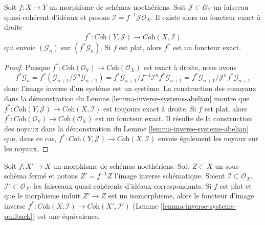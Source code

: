 \begin{lemma}
\label{lemma-inverse-systems-pullback}
Soit $f : X \to Y$ un morphisme de schémas noethériens.
Soit $\mathcal{J} \subset \mathcal{O}_Y$ un faisceau quasi-cohérent
d'idéaux et posons $\mathcal{I} = f^{-1}\mathcal{J} \mathcal{O}_X$.
Il existe alors un foncteur exact à droite
$$
f^* : \textit{Coh}(Y, \mathcal{J}) \longrightarrow \textit{Coh}(X, \mathcal{I})
$$
qui envoie $(\mathcal{G}_n)$ sur $(f^*\mathcal{G}_n)$. Si $f$ est plat,
alors $f^*$ est un foncteur exact.
\end{lemma}

\begin{proof}
Puisque $f^* : \textit{Coh}(\mathcal{O}_Y) \to \textit{Coh}(\mathcal{O}_X)$
est exact à droite, nous avons
$$
f^*\mathcal{G}_n =
f^*(\mathcal{G}_{n + 1}/\mathcal{I}^n\mathcal{G}_{n + 1}) =
f^*\mathcal{G}_{n + 1}/f^{-1}\mathcal{I}^nf^*\mathcal{G}_{n + 1} =
f^*\mathcal{G}_{n + 1}/\mathcal{J}^nf^*\mathcal{G}_{n + 1}
$$
donc l'image inverse d'un système est un système. La construction des
conoyaux dans la démonstration du Lemme \ref{lemma-inverse-systems-abelian}
montre que
$f^* : \textit{Coh}(Y, \mathcal{J}) \to \textit{Coh}(X, \mathcal{I})$
est toujours exact à droite. Si $f$ est plat, alors
$f^* : \textit{Coh}(\mathcal{O}_Y) \to \textit{Coh}(\mathcal{O}_X)$
est un foncteur exact. Il résulte de la construction des noyaux
dans la démonstration du Lemme \ref{lemma-inverse-systems-abelian}
que, dans ce cas,
$f^* : \textit{Coh}(Y, \mathcal{J}) \to \textit{Coh}(X, \mathcal{I})$
envoie également les noyaux sur les noyaux.
\end{proof}

\begin{lemma}
\label{lemma-inverse-systems-pullback-equivalence}
Soit $f : X' \to X$ un morphisme de schémas noethériens. Soit $Z \subset X$
un sous-schéma fermé et notons $Z' = f^{-1}Z$ l'image inverse
schématique. Soient $\mathcal{I} \subset \mathcal{O}_X$,
$\mathcal{I}' \subset \mathcal{O}_{X'}$ les faisceaux quasi-cohérents
d'idéaux correspondants.
Si $f$ est plat et que le morphisme induit $Z' \to Z$
est un isomorphisme, alors le foncteur d'image inverse
$f^* : \textit{Coh}(X, \mathcal{I}) \to \textit{Coh}(X', \mathcal{I}')$
(Lemme \ref{lemma-inverse-systems-pullback})
est une équivalence.
\end{lemma}

